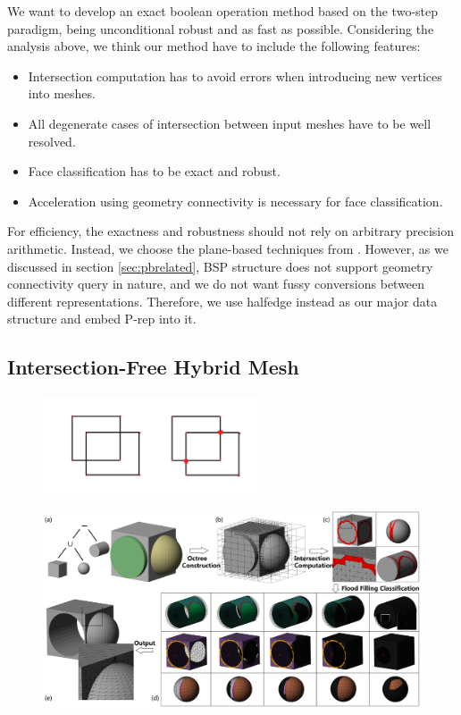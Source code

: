 \documentclass[10pt,journal,compsoc]{IEEEtran}
\begin{document}
We want to develop an exact boolean operation method based on the two-step paradigm, being unconditional robust and as fast as possible. Considering the analysis above, we think our method have to include the following features:
\begin{itemize}
    \item Intersection computation has to avoid errors when introducing new vertices into meshes.
    \item All degenerate cases of intersection between input meshes have to be well resolved.
    \item Face classification has to be exact and robust.
    \item Acceleration using geometry connectivity is necessary for face classification.
\end{itemize}

For efficiency, the exactness and robustness should not rely on arbitrary precision arithmetic. Instead, we choose the plane-based techniques from \cite{campen2010exact}. However, as we discussed in section \ref{sec:pbrelated}, BSP structure does not support geometry connectivity query in nature, and we do not want fussy conversions between different representations. Therefore, we use halfedge instead as our major data structure and embed P-rep into it.

\subsection{Intersection-Free Hybrid Mesh}

\begin{figure}[t]
\centering
\includegraphics[width=2.5in]{linkedhalfedge}
\caption{{\color{red}{Sketch: The Linked Halfedge structure}}}
\label{fig:linkedhalfedge}
\end{figure}


\begin{figure}[!t]
\centering
\includegraphics[width=7.1in]{flowchart}
\caption{{\color{red}{Sketch: overview, will be replaced}}}
\label{fig:overview}
\end{figure}
\end{document}
